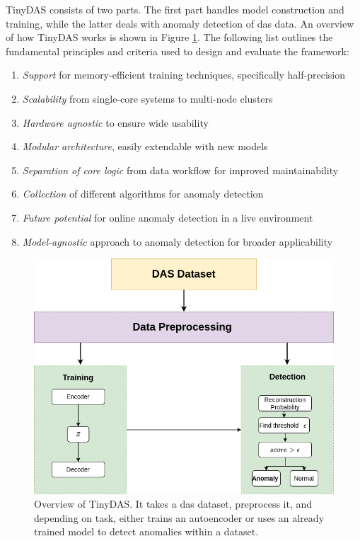 TinyDAS consists of two parts. The first part handles model construction and training, while the latter deals with anomaly detection of \acrshort{das} data. An overview of how TinyDAS works is shown in Figure \ref{fig:dataflow}. The following list outlines the fundamental principles and criteria used to design and evaluate the framework:

\clearpage

\begin{enumerate}
    \item \textit{Support} for memory-efficient training techniques, specifically half-precision
    \item \textit{Scalability} from single-core systems to multi-node clusters
    \item \textit{Hardware agnostic} to ensure wide usability
    \item \textit{Modular architecture}, easily extendable with new models
    \item \textit{Separation of core logic} from data workflow for improved maintainability
    \item \textit{Collection} of different algorithms for anomaly detection
    \item \textit{Future potential} for online anomaly detection in a live environment
    \item \textit{Model-agnostic} approach to anomaly detection for broader applicability
\end{enumerate}

\begin{figure}[!h]
    \centering
    \includegraphics[scale=0.5]{figures/methodflow.png}
    \caption{Overview of TinyDAS. It takes a \acrshort{das} dataset, preprocess it, and depending on task, either trains an autoencoder or uses an already trained model to detect anomalies within a dataset.}
    \label{fig:dataflow}
\end{figure}

